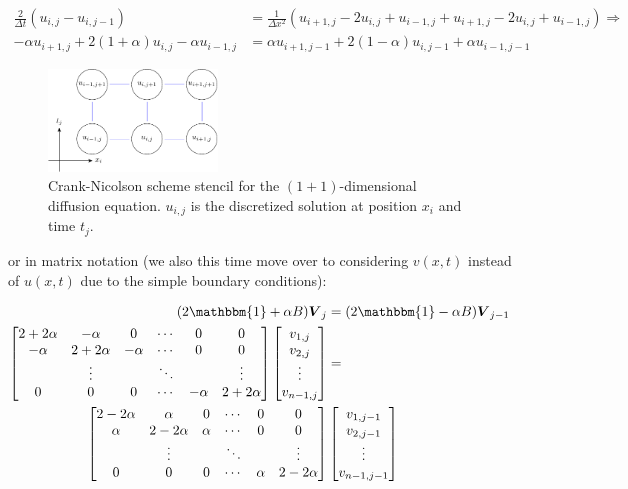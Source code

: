 \documentclass[a4paper, 11pt, notitlepage,english]{article}
\newcommand{\id}{\mathbbm{1}}
\begin{document}
\begin{align}
\frac{2}{\Delta t} (u_{i,j}-u_{i,j-1}) &= \frac{1}{\Delta x^2} (u_{i+1,j}-2u_{i,j}+u_{i-1,j}+u_{i+1,j}-2u_{i,j}+u_{i-1,j} ) \Rightarrow \\
 -\alpha u_{i+1,j} + 2(1+\alpha)u_{i,j} -\alpha u_{i-1,j} &= \alpha u_{i+1,j-1} + 2(1-\alpha) u_{i,j-1} + \alpha u_{i-1,j-1}
\label{eq:Crank_Nicoloson_scheme}
\end{align}

\begin{figure}[h!tb]
 \centering
 \includegraphics[width=0.4\textwidth]{Grid_CN-figure0}
 \caption{Crank-Nicolson scheme stencil for the $(1+1)$-dimensional diffusion equation. $u_{i,j}$ is the discretized solution at position $x_i$ and time $t_j$.}
 \label{fig:CN_grid}
\end{figure}

or in matrix notation (we also this time move over to considering $v(x,t)$ instead of $u(x,t)$ due to the simple boundary conditions):

\begin{align}
(2\id + \alpha B) \boldsymbol{V}_j &= (2\id - \alpha B) \boldsymbol{V}_{j-1} \\
\begin{bmatrix}
 2+2\alpha & -\alpha & 0 & \cdots & 0 & 0 \\
 -\alpha & 2+2\alpha & -\alpha & \cdots & 0 & 0 \\
  & \vdots & & \ddots & & \vdots \\
 0 & 0 & 0 & \cdots & -\alpha & 2+2\alpha \\
\end{bmatrix}
\begin{bmatrix}
v_{1,j} \\ v_{2,j} \\ \vdots \\ v_{n-1,j}
\end{bmatrix}
&= \\
\begin{bmatrix}
 2-2\alpha & \alpha & 0 & \cdots & 0 & 0 \\
 \alpha & 2-2\alpha & \alpha & \cdots & 0 & 0 \\
  & \vdots & & \ddots & & \vdots \\
 0 & 0 & 0 & \cdots & \alpha & 2-2\alpha \\
\end{bmatrix}
&\begin{bmatrix}
v_{1,j-1} \\ v_{2,j-1} \\ \vdots \\ v_{n-1,j-1}
\end{bmatrix}
\label{eq:Crank_Nicolson_matrix}
\end{align}
\end{document}
